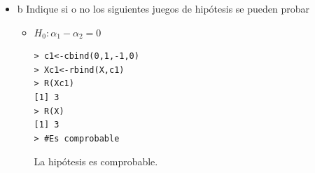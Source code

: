 \documentclass[12pt,a4paper]{report}
\begin{document}
\begin{itemize}
\begin{eqnarray*}
\begin{bmatrix}
\mu \\ \alpha_1 \\ \alpha_2 \\ \alpha_3
\end{bmatrix} &=& \begin{bmatrix}
1 & 1 & 1 & 1 & 1 & 1 & 1 & 1 \\
1 & 1 & 0 & 0 & 0 & 0 & 0 & 0 \\
0 & 0 & 1 & 1 & 1 & 1 & 0 & 0 \\
0 & 0 & 0 & 0 & 0 & 0 & 1 & 1
\end{bmatrix}\begin{bmatrix} Y_{11} \\ 
Y_{12} \\ Y_{21} \\ Y_{22} \\ Y_{23} \\ Y_{24} \\ Y_{31} \\ Y_{32}
\end{bmatrix}
\end{eqnarray*}
Por otra parte, se calcula en R la inversa generalizada de $X^tX$.\\
\begin{verbatim}
> #Inversa generalizada
> X<-matrix(c(1,1,1,1,1,1,1,1,1,1,0,0,0,0,0,0
,0,0,1,1,1,1,0,0,0,0,0,0,0,0,1,1),8,4)
> X
     [,1] [,2] [,3] [,4]
[1,]    1    1    0    0
[2,]    1    1    0    0
[3,]    1    0    1    0
[4,]    1    0    1    0
[5,]    1    0    1    0
[6,]    1    0    1    0
[7,]    1    0    0    1
[8,]    1    0    0    1
> XtX<-t(X)%*%X
> XtX
     [,1] [,2] [,3] [,4]
[1,]    8    2    4    2
[2,]    2    2    0    0
[3,]    4    0    4    0
[4,]    2    0    0    2
> invXtX<-Ginv(XtX);invXtX
     [,1] [,2]  [,3] [,4]
[1,]  0.5 -0.5 -0.50    0
[2,] -0.5  1.0  0.50    0
[3,] -0.5  0.5  0.75    0
[4,]  0.0  0.0  0.00    0
\end{verbatim}


$$(X^tX)^- = \begin{bmatrix}
\frac{1}{2} & -\frac{1}{2} & -\frac{1}{2} & 0 \\
-\frac{1}{2} & 1 & \frac{1}{2} & 0 \\
-\frac{1}{2} & \frac{1}{2} & \frac{3}{4} & 0 \\
0 & 0 & 0 & 0
\end{bmatrix}$$
 
\item b Indique si o no los siguientes juegos de hipótesis se pueden probar\\
\begin{itemize}
\item $H_0:\alpha_1 - \alpha_2 =0$
\begin{verbatim}
> c1<-cbind(0,1,-1,0)
> Xc1<-rbind(X,c1)
> R(Xc1)
[1] 3
> R(X) 
[1] 3
> #Es comprobable
\end{verbatim}
La hipótesis es comprobable.



\end{itemize}
\end{itemize}
\end{document}
